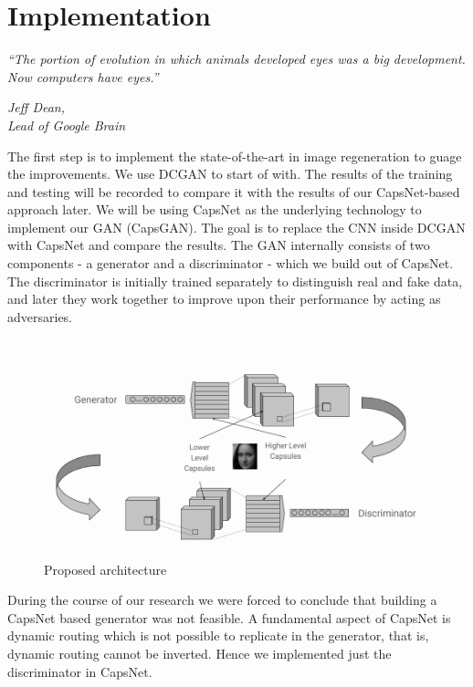 \chapter{Implementation}\label{ch:implementation}
\epigraph{\textit{ \normalsize“The portion of evolution in which animals developed eyes was a big development. Now computers have eyes.”}}{\normalsize\textit{Jeff Dean,\\ Lead of Google Brain}}


The first step is to implement the state-of-the-art in image regeneration to guage the improvements. We use DCGAN to start of with. The results of the training and testing will be recorded to compare it with the results of our CapsNet-based approach later. We will be using CapsNet as the underlying technology to implement our GAN (CapsGAN). The goal is to replace the CNN inside DCGAN with CapsNet and compare the results. The GAN internally consists of two components - a generator and a discriminator - which we build out of CapsNet. The discriminator is initially trained separately to distinguish real and fake data, and later they work together to improve upon their performance by acting as adversaries.
\par\bigskip

\begin{figure}[H]
\centering\includegraphics[width=1\textwidth]{images/methodology.png}
\caption{Proposed architecture}
\label{fig:capsgan}
\end{figure}

During the course of our research we were forced to conclude that building a CapsNet based generator was not feasible. A fundamental aspect of CapsNet is dynamic routing which is not possible to replicate in the generator, that is, dynamic routing cannot be inverted. Hence we implemented just the discriminator in CapsNet. 
\par\bigskip

